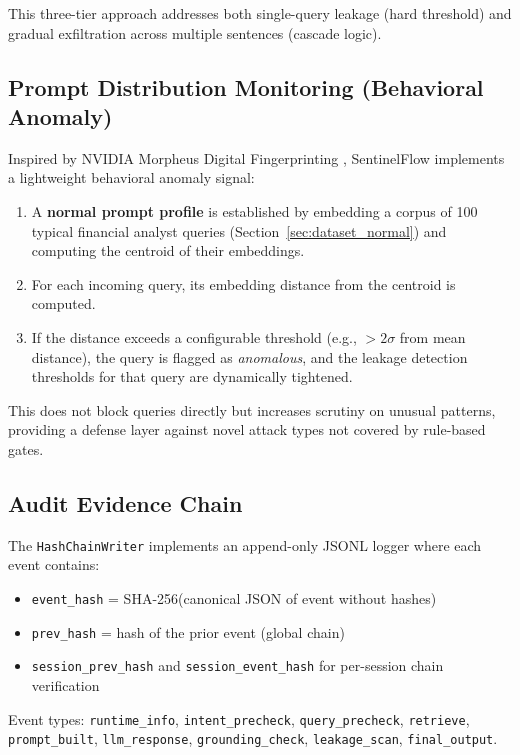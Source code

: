 \documentclass[12pt,a4paper]{article}
\begin{document}
This three-tier approach addresses both single-query leakage (hard threshold) and gradual exfiltration across multiple sentences (cascade logic).

\subsection{Prompt Distribution Monitoring (Behavioral Anomaly)}
\label{sec:prompt_monitoring}

Inspired by NVIDIA Morpheus Digital Fingerprinting \cite{nvidia_morpheus}, SentinelFlow implements a lightweight behavioral anomaly signal:

\begin{enumerate}[leftmargin=*]
    \item A \textbf{normal prompt profile} is established by embedding a corpus of 100 typical financial analyst queries (Section~\ref{sec:dataset_normal}) and computing the centroid of their embeddings.
    \item For each incoming query, its embedding distance from the centroid is computed.
    \item If the distance exceeds a configurable threshold (e.g., $> 2\sigma$ from mean distance), the query is flagged as \textit{anomalous}, and the leakage detection thresholds for that query are dynamically tightened.
\end{enumerate}

This does not block queries directly but increases scrutiny on unusual patterns, providing a defense layer against novel attack types not covered by rule-based gates.

\subsection{Audit Evidence Chain}

The \texttt{HashChainWriter} implements an append-only JSONL logger where each event contains:
\begin{itemize}[leftmargin=*]
    \item \texttt{event\_hash} = SHA-256(canonical JSON of event without hashes)
    \item \texttt{prev\_hash} = hash of the prior event (global chain)
    \item \texttt{session\_prev\_hash} and \texttt{session\_event\_hash} for per-session chain verification
\end{itemize}

Event types: \texttt{runtime\_info}, \texttt{intent\_precheck}, \texttt{query\_precheck}, \texttt{retrieve}, \texttt{prompt\_built}, \texttt{llm\_response}, \texttt{grounding\_check}, \texttt{leakage\_scan}, \texttt{final\_output}.
\end{document}
